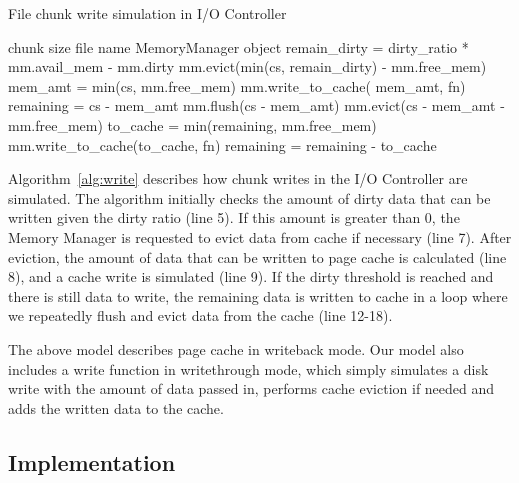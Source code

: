 \documentclass[conference]{IEEEtran}
\newcommand{\Desc}[2]{\State \makebox[2em][l]{#1}#2}
\begin{document}
    \begin{algorithm}\caption{File chunk write simulation in I/O Controller}
    \label{alg:write}
        \small
        \begin{algorithmic}[1]
        \Input
            \Desc{cs}{chunk size}
            \Desc{fn}{file name}
            \Desc{mm}{MemoryManager object}
           \EndInput
        \State remain\_dirty = dirty\_ratio * mm.avail\_mem - mm.dirty
         
            \State mm.evict(min(cs, remain\_dirty) - mm.free\_mem)
            \State mem\_amt = min(cs, mm.free\_mem)
            \State mm.write\_to\_cache( mem\_amt, fn)
        \EndIf
        \State remaining = cs - mem\_amt
          
            \State mm.flush(cs - mem\_amt)
            \State mm.evict(cs - mem\_amt  - mm.free\_mem)
            \State to\_cache = min(remaining, mm.free\_mem)
            \State mm.write\_to\_cache(to\_cache, fn)
            \State remaining = remaining - to\_cache
        \EndWhile

        \end{algorithmic}
    \end{algorithm}
    Algorithm~\ref{alg:write} describes how chunk writes in
    the I/O Controller are simulated.
    The algorithm initially checks the  amount of dirty data that
    can be written given the dirty ratio (line 5).
    If this amount is greater than 0, the Memory Manager is requested to evict
    data from cache if necessary (line 7).
    After eviction, the amount of data that can be written to
    page cache is calculated (line 8), and a cache write is simulated (line 9).
    If the dirty threshold is reached and there is still data to write,
    the remaining data is written to cache in a loop
    where we repeatedly flush and evict data from the cache (line 12-18).

    The above model describes page cache in writeback
    mode. Our model also includes a write function in writethrough mode,
    which simply simulates a disk write with the amount of data passed in,
    performs cache eviction if needed and adds the written data to the cache.

        \subsection{Implementation}
\end{document}
